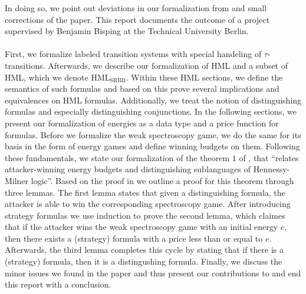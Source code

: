 In doing so, we point out deviations in our formalization from and small corrections of the paper. This report documents the outcome of a project supervised by Benjamin Bisping at the Technical University Berlin. 
\\\\
First, we formalize labeled transition systems with special handeling of $\tau$-transitions.
Afterwards, we describe our formalization of HML and a subset of HML, which we denote HML$_\text{SRBB}$.
Within these HML sections, we define the semantics of such formulas and based on this prove several implications and equivalences on HML formulas.
Additionally, we treat the notion of distinguishing formulas and especially distinguishing conjunctions.
In the following sections, we present our formalization of energies as a data type and a price function for formulas.
Before we formalize the weak spectroscopy game, we do the same for its basis in the form of energy games and define winning budgets on them.
Following these fundamentals, we state our formalization of the theorem $1$ of \cite{bisping2023lineartimebranchingtime}, that ``relates attacker-winning energy budgets and distinguishing sublanguages of Hennessy-Milner logic''. 
Based on the proof in \cite{bisping2023lineartimebranchingtime} we outline a proof for this theorem through three lemmas. 
The first lemma states that given a distinguishing formula, the attacker is able to win the corresponding spectroscopy game.
After introducing strategy formulas we use induction to prove the second lemma, which claimes that if the attacker wins the weak spectroscopy game with an initial energy $e$, then there exists a (strategy) formula with a price less than or equal to $e$.
Afterwards, the third lemma completes this cycle by stating that if there is a (strategy) formula, then it is a distingushing formula.
Finally, we discuss the minor issues we found in the paper and thus present our contributions to \cite{bisping2023lineartimebranchingtime} and end this report with a conclusion.
